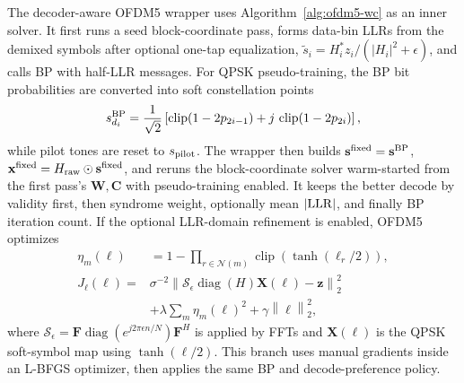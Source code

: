 \documentclass[journal]{IEEEtran}
\newcommand{\norm}[1]{\left\lVert #1 \right\rVert}
\newcommand{\abs}[1]{\left\lvert #1 \right\rvert}
\begin{document}
The decoder-aware OFDM5 wrapper uses Algorithm~\ref{alg:ofdm5-wc} as an inner
solver. It first runs a seed block-coordinate pass, forms data-bin LLRs from the
demixed symbols after optional one-tap equalization,
\(\tilde s_i=H_i^*z_i/(\abs{H_i}^2+\epsilon)\), and calls BP with half-LLR
messages. For QPSK pseudo-training, the BP bit probabilities are converted into
soft constellation points
\begin{equation}
  s^{\rm BP}_{d_i}
  =\frac{1}{\sqrt2}\left[
    \operatorname{clip}(1-2p_{2i-1})+
    j\,\operatorname{clip}(1-2p_{2i})\right],
  \label{eq:ofdm5-wrapper-soft-qpsk}
\end{equation}
while pilot tones are reset to \(s_{\rm pilot}\). The wrapper then builds
\(\mathbf s^{\rm fixed}=\mathbf s^{\rm BP}\),
\(\mathbf x^{\rm fixed}=H_{\rm raw}\odot\mathbf s^{\rm fixed}\), and reruns the
block-coordinate solver warm-started from the first pass's \(\mathbf W,\mathbf C\)
with pseudo-training enabled. It keeps the better decode by validity first,
then syndrome weight, optionally mean \(|{\rm LLR}|\), and finally BP iteration
count. If the optional LLR-domain refinement is enabled, OFDM5 optimizes
\begin{equation}
\begin{aligned}
  \eta_m(\boldsymbol\ell)
  &=1-\prod_{r\in\mathcal N(m)}
    \operatorname{clip}\!\left(\tanh(\ell_r/2)\right),\\
  J_{\ell}(\boldsymbol\ell)
  ={}&\sigma^{-2}\norm{
    \mathcal S_\epsilon\operatorname{diag}(H)\mathbf X(\boldsymbol\ell)
    -\mathbf z}_2^2\\
  &+\lambda\sum_m\eta_m(\boldsymbol\ell)^2
    +\gamma\norm{\boldsymbol\ell}_2^2 ,
\end{aligned}
  \label{eq:ofdm5-wrapper-llr-loss}
\end{equation}
where \(\mathcal S_\epsilon=\mathbf F\operatorname{diag}
(e^{j2\pi\epsilon n/N})\mathbf F^H\) is applied by FFTs and
\(\mathbf X(\boldsymbol\ell)\) is the QPSK soft-symbol map using
\(\tanh(\ell/2)\). This branch uses manual gradients inside an L-BFGS optimizer,
then applies the same BP and decode-preference policy.
\end{document}
